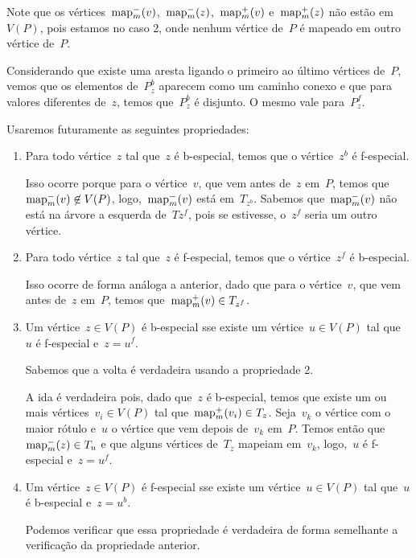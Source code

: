 	Note que os vértices~$\mathrm{map}^-_m(v)$,~$\mathrm{map}^-_m(z)$,~$\mathrm{map}^+_m(v)$ 
	e~$\mathrm{map}^+_m(z)$ não estão em~$V(P)$, pois estamos no caso 2, onde
	nenhum vértice de~$P$ é mapeado em outro vértice de~$P$.

	Considerando que existe uma aresta ligando o primeiro ao último 
	vértices de~$P$, vemos que os elementos de~$P_z^b$ aparecem 
	como um caminho conexo e que para valores diferentes de~$z$,
	temos que~$P_z^b$ é disjunto.
	O mesmo vale para~$P_z^f$.

	Usaremos futuramente as seguintes propriedades:
	\begin{enumerate}
		\item Para todo vértice~$z$ tal que~$z$ é b-especial, 
		temos que o vértice~$z^b$ é f-especial.

		Isso ocorre porque para o vértice~$v$, que vem antes 
		de~$z$ em~$P$, temos que~${\mathrm{map}^-_m(v)\not\in V(P)}$, 
		logo,~$\mathrm{map}^-_m(v)$ está em~$T_{z^b}$.
		Sabemos que~$\mathrm{map}^-_m(v)$ não está na árvore a esquerda
		de~$T{z^f}$, pois se estivesse, o~$z^f$ seria um outro
		vértice.

		\item Para todo vértice~$z$ tal que~$z$ é f-especial, 
		temos que o vértice~$z^f$ é b-especial.

		Isso ocorre de forma análoga a anterior, dado que
		para o vértice~$v$, que vem antes de~$z$ em~$P$, temos
		que~${\mathrm{map}^+_m(v)\in T_{z^f}}$.

		\item Um vértice~${z\in V(P)}$ é b-especial sse existe um
		vértice~${u\in V(P)}$ tal que~$u$ é f-especial e~${z=u^f}$.

		Sabemos que a volta é verdadeira usando a propriedade 2.
		
		A ida é verdadeira pois, dado que~$z$ é b-especial,
		temos que existe um ou mais vértices~${v_i\in V(P)}$ tal
		que~${\mathrm{map}^+_m(v_i)\in T_{z}}$.
		Seja~$v_k$ o vértice com o maior rótulo e~$u$ o vértice 
		que vem depois de~$v_k$ em~$P$. 
		Temos então que~${\mathrm{map}^-_m(z)\in T_u}$ e que alguns vértices
		de~$T_z$ mapeiam em~$v_k$, logo,~$u$ é f-especial e~${z=u^f}$.

		\item Um vértice~${z\in V(P)}$ é f-especial sse existe um
		vértice~${u\in V(P)}$ tal que~$u$ é b-especial e~${z=u^b}$.

		Podemos verificar que essa propriedade é verdadeira de forma
		semelhante a verificação da propriedade anterior.
	\end{enumerate}

